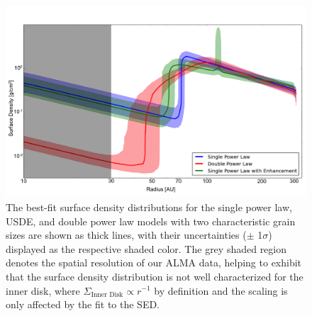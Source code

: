 {{%

\begin{figure}
\centering
\includegraphics[width = 1\textwidth]{49CET_SDD2_withShaded_oldPerson.png}
\caption{The best-fit surface density distributions for the single power law, USDE, and double power law models with two characteristic grain sizes are shown as thick lines, with their uncertainties ($\pm$ 1$\sigma$) displayed as the respective shaded color. The grey shaded region denotes the spatial resolution of our ALMA data, helping to exhibit that the surface density distribution is not well characterized for the inner disk, where $\Sigma_{\text{Inner Disk}} \propto r^{-1}$ by definition and the scaling is only affected by the fit to the SED.}
\label{fig:densityDistr}
\end{figure}














}}
